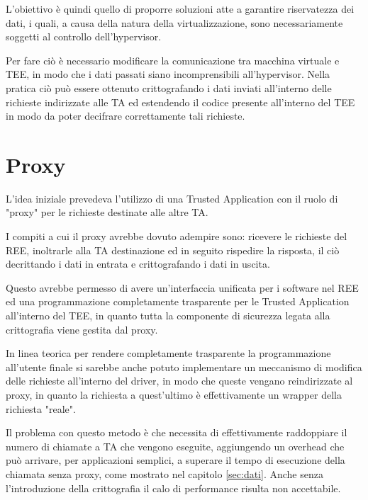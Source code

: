 \documentclass[12pt,italian]{report}
\begin{document}
	L'obiettivo è quindi quello di proporre soluzioni atte a garantire riservatezza dei dati, i quali, a causa della natura della virtualizzazione, sono necessariamente soggetti al controllo dell'hypervisor.
	
	\bigbreak
	
	Per fare ciò è necessario modificare la comunicazione tra macchina virtuale e TEE, in modo che i dati passati siano incomprensibili all'hypervisor. Nella pratica ciò può essere ottenuto crittografando i dati inviati all'interno delle richieste indirizzate alle TA ed estendendo il codice presente all'interno del TEE in modo da poter decifrare correttamente tali richieste. 
	
	\section{Proxy}
	\label{sec:proxy}
	L'idea iniziale prevedeva l'utilizzo di una Trusted Application con il ruolo di "proxy" per le richieste destinate alle altre TA. 
	
	I compiti a cui il proxy avrebbe dovuto adempire sono: ricevere le richieste del REE, inoltrarle alla TA destinazione ed in seguito rispedire la risposta, il ciò decrittando i dati in entrata e crittografando i dati in uscita.
	
	\bigbreak
	
	Questo avrebbe permesso di avere un'interfaccia unificata per i software nel REE ed una programmazione completamente trasparente per le Trusted Application all'interno del TEE, in quanto tutta la componente di sicurezza legata alla crittografia viene gestita dal proxy. 
	
	In linea teorica per rendere completamente trasparente la programmazione all'utente finale si sarebbe anche potuto implementare un meccanismo di modifica delle richieste all'interno del driver, in modo che queste vengano reindirizzate al proxy, in quanto la richiesta a quest'ultimo è effettivamente un wrapper della richiesta "reale".
	
	\bigbreak
	
	Il problema con questo metodo è che necessita di effettivamente raddoppiare il numero di chiamate a TA che vengono eseguite, aggiungendo un overhead che può arrivare, per applicazioni semplici, a superare il tempo di esecuzione della chiamata senza proxy, come mostrato nel capitolo \ref{sec:dati}. Anche senza l'introduzione della crittografia il calo di performance risulta non accettabile.
	
	\bigbreak
	
\end{document}
